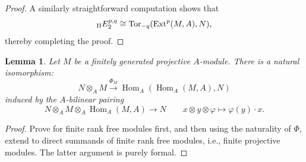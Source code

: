 \documentclass[11pt]{article}
\theoremstyle{thmstyle}
\newtheorem{lemma}[theorem]{Lemma}
\theoremstyle{defstyle}
\newcommand{\Tor}{\operatorname{Tor}}
\newcommand{\Hom}{\operatorname{Hom}}
\newcommand{\Ext}{\operatorname{Ext}}
\begin{document}
\begin{proof}
    A similarly straightforward computation shows that 
    \begin{equation*}
        {}_{\rm II}E^{p, q}_2\cong\Tor_{-q}(\Ext^p(M, A), N),
    \end{equation*}
    thereby completing the proof.
\end{proof}

\begin{lemma}
    Let $M$ be a finitely generated projective $A$-module. There is a natural isomorphism: 
    \begin{equation*}
        N\otimes_A M\xrightarrow{\Phi_M}\Hom_A\left(\Hom_A(M, A), N\right)
    \end{equation*}
    induced by the $A$-bilinear pairing 
    \begin{equation*}
        N\otimes_A M\otimes_A \Hom_A(M, A)\to N\qquad x\otimes y\otimes \varphi\mapsto \varphi(y)\cdot x.
    \end{equation*}
\end{lemma}
\begin{proof}
    Prove for finite rank free modules first, and then using the naturality of $\Phi$, extend to direct summands of finite rank free modules, i.e., finite projective modules. The latter argument is purely formal.
\end{proof}
\end{document}
